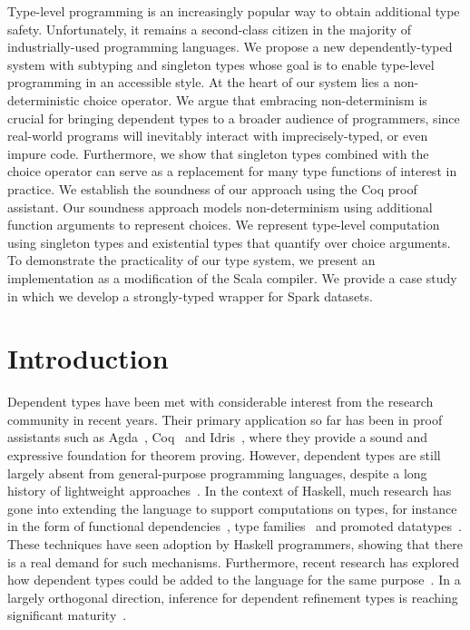 \newcommand{\oursystem}{$\lambda${\tiny $\mathop{\protect\vphantom{X}}^\text{nd}_{<:\{\}}$}\xspace}
\newcommand\FR{System~FR\xspace}
\newcommand\singleton[1]{\lbrace #1 \rbrace}

Type-level programming is an increasingly popular way to obtain additional type safety.
Unfortunately, it remains a second-class citizen in the majority of industrially-used programming languages.
We propose a new dependently-typed system with subtyping and singleton types whose goal is to enable type-level programming in an accessible style.
At the heart of our system lies a non-deterministic choice operator.
We argue that embracing non-determinism is crucial for bringing dependent types to a broader audience of programmers, since real-world programs will inevitably interact with imprecisely-typed, or even impure code.
Furthermore, we show that singleton types combined with the choice operator can serve as a replacement for many type functions of interest in practice.
We establish the soundness of our approach using the Coq proof assistant.
Our soundness approach models non-determinism using additional function arguments to represent choices.
We represent type-level computation using singleton types and existential types that quantify over choice arguments.
To demonstrate the practicality of our type system, we present an implementation as a modification of the Scala compiler.
We provide a case study in which we develop a strongly-typed wrapper for Spark datasets.

\section{Introduction}

Dependent types have been met with considerable interest from the research community in recent years.
Their primary application so far has been in proof assistants such as Agda~\citep{norell2007towards}, Coq~\citep{bertot2004interactive} and Idris~\citep{brady2013idris}, where they provide a sound and expressive foundation for theorem proving.
However, dependent types are still largely absent from general-purpose programming languages, despite a long history of lightweight approaches~\citep{xi1998eliminating}.
In the context of Haskell, much research has gone into extending the language to support computations on types, for instance in the form of functional dependencies~\citep{jones2000type}, type families~\citep{kiselyov2010fun} and promoted datatypes~\citep{yorgey2012giving}.
These techniques have seen adoption by Haskell programmers, showing that there is a real demand for such mechanisms.
Furthermore, recent research has explored how dependent types could be added to the language for the same purpose~\citep{eisenberg2016dependent, weirich2017a}.
In a largely orthogonal direction, inference for dependent refinement types is reaching significant maturity~\citep{vazou2018gradual, vazou2017refinement,vazou2015bounded}.

